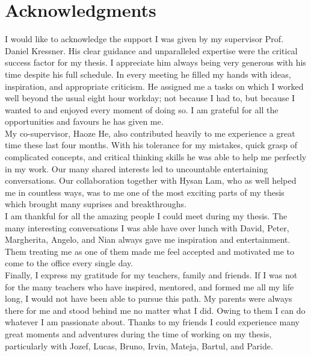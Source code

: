 \chapter*{Acknowledgments}
\label{chp:0-acknowledgments}

I would like to acknowledge the support I was given by my supervisor
Prof. Daniel Kressner. His clear guidance and unparalleled expertise were the
critical success factor for my thesis. I appreciate him always being very generous
with his time despite his full schedule. In every meeting he filled my hands with
ideas, inspiration, and appropriate criticism. He assigned me a tasks on which
I worked well beyond the usual eight hour workday; not because I had to, but because
I wanted to and enjoyed every moment of doing so. I am grateful for all the
opportunities and favours he has given me.\\ %

My co-supervisor, Haoze He, also contributed heavily to me experience a great time
these last four months. With his tolerance for my mistakes, quick grasp of
complicated concepts, and critical thinking skills he was able to help me
perfectly in my work. Our many shared interests led to uncountable
entertaining conversations. Our collaboration together with Hysan Lam, who
as well helped me in countless ways, was to me one of the most exciting parts of
my thesis which brought many suprises and breakthroughs.\\

I am thankful for all the amazing people I could meet during my thesis.
The many interesting conversations I was able have over lunch with David, Peter,
Margherita, Angelo, and Nian always gave me inspiration and entertainment.
Them treating me as one of them made me feel accepted and motivated me to come
to the office every single day.\\

Finally, I express my gratitude for my teachers, family and friends.
If I was not for the many teachers who have inspired, mentored, and formed me
all my life long, I would not have been able to pursue this path.
My parents were always there for me and stood behind me no matter what I did.
Owing to them I can do whatever I am passionate about.
Thanks to my friends I could experience many great moments and adventures
during the time of working on my thesis, particularly with Jozef, Lucas, Bruno,
Irvin, Mateja, Bartul, and Paride.
